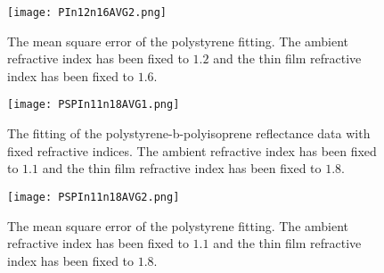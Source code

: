 \documentclass[MasterThesisMain.tex]{subfiles}
\begin{document}
\begin{figure}[H]
\centering
\texttt{[image: PIn12n16AVG2.png]}
\caption{The mean square error of the polystyrene fitting. The ambient refractive index has been fixed to $1.2$ and the thin film refractive index has been fixed to $1.6$.}
\label{}
\end{figure}

\begin{figure}[H]
\centering
\texttt{[image: PSPIn11n18AVG1.png]}
\caption{The fitting of the polystyrene-b-polyisoprene reflectance data with fixed refractive indices. The ambient refractive index has been fixed to $1.1$ and the thin film refractive index has been fixed to $1.8$.}
\label{}
\end{figure}

\begin{figure}[H]
\centering
\texttt{[image: PSPIn11n18AVG2.png]}
\caption{The mean square error of the polystyrene fitting. The ambient refractive index has been fixed to $1.1$ and the thin film refractive index has been fixed to $1.8$.}
\label{}
\end{figure}     
\end{document}
